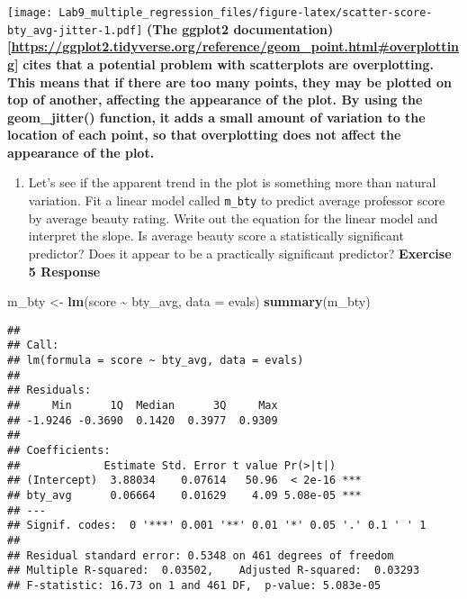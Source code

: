 \documentclass[
]{article}
\newenvironment{Shaded}{\begin{snugshade}}{\end{snugshade}}
\newcommand{\AttributeTok}[1]{\textcolor[rgb]{0.13,0.29,0.53}{#1}}
\newcommand{\FunctionTok}[1]{\textcolor[rgb]{0.13,0.29,0.53}{\textbf{#1}}}
\newcommand{\NormalTok}[1]{#1}
\newcommand{\OtherTok}[1]{\textcolor[rgb]{0.56,0.35,0.01}{#1}}
\newcommand{\SpecialCharTok}[1]{\textcolor[rgb]{0.81,0.36,0.00}{\textbf{#1}}}
\providecommand{\tightlist}{%
  \setlength{\itemsep}{0pt}\setlength{\parskip}{0pt}}
\begin{document}
\texttt{[image: Lab9\_multiple\_regression\_files/figure-latex/scatter-score-bty\_avg-jitter-1.pdf]}
\textbf{(The ggplot2
documentation){[}\url{https://ggplot2.tidyverse.org/reference/geom_point.html\#overplotting}{]}}
\textbf{cites that a potential problem with scatterplots are
overplotting. This means} \textbf{that if there are too many points,
they may be plotted on top of another,} \textbf{affecting the appearance
of the plot. By using the geom\_jitter() function,} \textbf{it adds a
small amount of variation to the location of each point, so that}
\textbf{overplotting does not affect the appearance of the plot.}

\begin{enumerate}
\def\labelenumi{\arabic{enumi}.}
\setcounter{enumi}{4}
\tightlist
\item
  Let's see if the apparent trend in the plot is something more than
  natural variation. Fit a linear model called \texttt{m\_bty} to
  predict average professor score by average beauty rating. Write out
  the equation for the linear model and interpret the slope. Is average
  beauty score a statistically significant predictor? Does it appear to
  be a practically significant predictor? \textbf{Exercise 5 Response}
\end{enumerate}

\begin{Shaded}
\begin{Highlighting}[]
\NormalTok{m\_bty }\OtherTok{\textless{}{-}} \FunctionTok{lm}\NormalTok{(score }\SpecialCharTok{\textasciitilde{}}\NormalTok{ bty\_avg, }\AttributeTok{data =}\NormalTok{ evals)}
\FunctionTok{summary}\NormalTok{(m\_bty)}
\end{Highlighting}
\end{Shaded}

\begin{verbatim}
## 
## Call:
## lm(formula = score ~ bty_avg, data = evals)
## 
## Residuals:
##     Min      1Q  Median      3Q     Max 
## -1.9246 -0.3690  0.1420  0.3977  0.9309 
## 
## Coefficients:
##             Estimate Std. Error t value Pr(>|t|)    
## (Intercept)  3.88034    0.07614   50.96  < 2e-16 ***
## bty_avg      0.06664    0.01629    4.09 5.08e-05 ***
## ---
## Signif. codes:  0 '***' 0.001 '**' 0.01 '*' 0.05 '.' 0.1 ' ' 1
## 
## Residual standard error: 0.5348 on 461 degrees of freedom
## Multiple R-squared:  0.03502,    Adjusted R-squared:  0.03293 
## F-statistic: 16.73 on 1 and 461 DF,  p-value: 5.083e-05
\end{verbatim}
\end{document}
